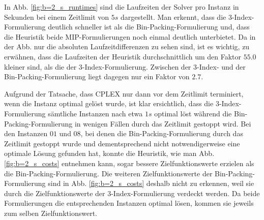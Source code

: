 \pagebreak

In Abb. \ref{fig:b=2_s_runtimes} sind die Laufzeiten der Solver pro Instanz in Sekunden bei einem Zeitlimit von $5s$ dargestellt.
Man erkennt, dass die 3-Index-Formulierung deutlich schneller ist als die Bin-Packing-Formulierung und, dass die Heuristik beide MIP-Formulierungen noch einmal deutlich unterbietet. Da in der Abb. nur die absoluten Laufzeitdifferenzen zu sehen sind,
ist es wichtig, zu erwähnen, dass die Laufzeiten der Heuristik durchschnittlich um den Faktor $55.0$ kleiner sind,
als die der 3-Index-Formulierung. Zwischen der 3-Index- und der Bin-Packing-Formulierung liegt dagegen nur ein Faktor von $2.7$.

Aufgrund der Tatsache, dass CPLEX nur dann vor dem Zeitlimit terminiert, wenn die Instanz optimal gelöst wurde, ist klar
ersichtlich, dass die 3-Index-Formulierung sämtliche Instanzen nach etwa $1s$ optimal löst während die Bin-Packing-Formulierung in wenigen Fällen durch das Zeitlimit gestoppt wird.\newline
Bei den Instanzen $01$ und $08$, bei denen die Bin-Packing-Formulierung durch das Zeitlimit gestoppt wurde und dementsprechend nicht
notwendigerweise eine optimale Lösung gefunden hat, konnte die Heuristik, wie man Abb. \ref{fig:b=2_s_costs} entnehmen kann, sogar
bessere Zielfunktionswerte erzielen als die Bin-Packing-Formulierung.\newline
Die weiteren Zielfunktionswerte der Bin-Packing-Formulierung sind in Abb. \ref{fig:b=2_s_costs}  deshalb nicht zu erkennen,
weil sie durch die Zielfunktionswerte der 3-Index-Formulierung verdeckt werden. Da beide Formulierungen die entsprechenden
Instanzen optimal lösen, kommen sie jeweils zum selben Zielfunktionswert.

